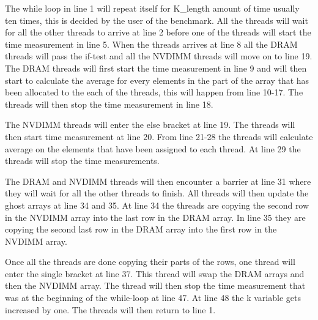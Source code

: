 \documentclass[12pt,a4paper,USenglish]{article}      %
\begin{document}
The while loop in line 1 will repeat itself for K\_length amount of time usually ten times, this is decided by the user of the benchmark. All the threads will wait for all the other threads to arrive at line 2 before one of the threads will start the time measurement in line 5.
When the threads arrives at line 8 all the DRAM threads will pass the if-test and all the NVDIMM threads will move on to line 19. The DRAM threads will first start the time measurement in line 9 and will then start to calculate the average for every elements in the  part of the array that has been allocated to the each of the threads, this will happen from line 10-17. The threads will then stop the time measurement in line 18.

The NVDIMM threads will enter the else bracket at line 19. The threads will then start time measurement at line 20. From line 21-28 the threads will calculate average on the elements that have been assigned to each thread. At line 29 the threads will stop the time measurements.

The DRAM and NVDIMM threads will then encounter a barrier at line 31 where they will wait for all the other threads to finish. All threads will then update the ghost arrays at line 34 and 35. At line 34 the threads are copying the second row in the NVDIMM array into the last row in the DRAM array. In line 35 they are copying the second last row in the DRAM array into the first row in the NVDIMM array.

Once all the threads are done copying their parts of the rows, one thread will enter the single bracket at line 37. This thread will swap the DRAM arrays and then the NVDIMM array. The thread will then stop the time measurement that was at the beginning of the while-loop at line 47. At line 48 the k variable gets increased by one. The threads will then return to line 1. 
\end{document}
